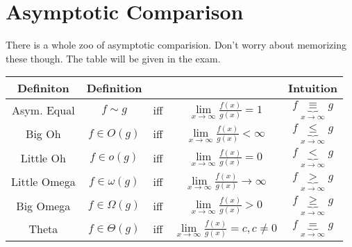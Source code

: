 \documentclass[a4paper, 12pt]{article}
\begin{document}
\section*{Asymptotic Comparison}
There is a whole zoo of asymptotic comparision. Don't worry about memorizing these though. The table will be given in the exam.
\renewcommand{\arraystretch}{2}
\begin{center}
	\begin{tabular}{c |c c c | c}
	\hline\hline
	Definiton & Definition & & & Intuition\\
	\hline\hline  Asym. Equal & $f \sim g$ & iff & $\lim\limits_{x\to \infty} \frac{f(x)}{g(x)} = 1$  & $f \underbrace{\equiv}_{x \to \infty} g$\\ 
	Big Oh & $f \in O(g)$ & iff & $\lim\limits_{x\to \infty} \frac{f(x)}{g(x)} < \infty$ & $f \underbrace{\le}_{x \to \infty} g$  \\ 
	Little Oh  & $f \in o(g)$ & iff & $\lim\limits_{x\to \infty} \frac{f(x)}{g(x)} = 0$ & $f \underbrace{<}_{x \to \infty} g$ \\ 
	Little Omega & $f \in \omega(g)$ & iff & $\lim\limits_{x\to \infty} \frac{f(x)}{g(x)} \to \infty$ & $f \underbrace{>}_{x \to \infty} g$ \\ 
	Big Omega  & $f \in \Omega(g)$ & iff & $\lim\limits_{x\to \infty} \frac{f(x)}{g(x)} > 0 $ & $f \underbrace{\ge}_{x \to \infty} g$ \\ 
	Theta & $f \in \Theta(g)$ & iff & $\lim\limits_{x\to \infty} \frac{f(x)}{g(x)} =c, c\ne 0$ & $f \underbrace{=}_{x \to \infty} g$ \\ 
	\hline\hline 
\end{tabular}
\end{center}
\end{document}
